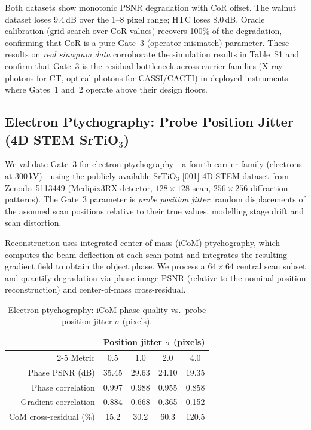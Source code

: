 \documentclass[11pt]{article}
\theoremstyle{definition}
\begin{document}
\noindent Both datasets show monotonic PSNR degradation with CoR offset.
The walnut dataset loses $9.4$\,dB over the 1--8 pixel range; HTC loses $8.0$\,dB.
Oracle calibration (grid search over CoR values) recovers 100\% of the degradation, confirming that CoR is a pure Gate~3 (operator mismatch) parameter.
These results on \emph{real sinogram data} corroborate the simulation results in Table~S1 and confirm that Gate~3 is the residual bottleneck across carrier families (X-ray photons for CT, optical photons for CASSI/CACTI) in deployed instruments where Gates~1 and~2 operate above their design floors.

\subsection{Electron Ptychography: Probe Position Jitter (4D STEM SrTiO\texorpdfstring{$_3$}{3})}
\label{sec:ptycho_real}

We validate Gate~3 for electron ptychography---a fourth carrier family (electrons at 300\,kV)---using the publicly available SrTiO$_3$ [001] 4D-STEM dataset from Zenodo~5113449 (Medipix3RX detector, $128\times128$ scan, $256\times256$ diffraction patterns).
The Gate~3 parameter is \emph{probe position jitter}: random displacements of the assumed scan positions relative to their true values, modelling stage drift and scan distortion.

Reconstruction uses integrated center-of-mass (iCoM) ptychography, which computes the beam deflection at each scan point and integrates the resulting gradient field to obtain the object phase.
We process a $64\times64$ central scan subset and quantify degradation via phase-image PSNR (relative to the nominal-position reconstruction) and center-of-mass cross-residual.

\begin{table}[!ht]
\centering\small
\caption{Electron ptychography: iCoM phase quality vs.\ probe position jitter $\sigma$ (pixels).}
\label{tab:ptycho_jitter}
\begin{tabular}{@{}rcccc@{}}
\toprule
& \multicolumn{4}{c}{Position jitter $\sigma$ (pixels)} \\
\cmidrule(l){2-5}
Metric & 0.5 & 1.0 & 2.0 & 4.0 \\
\midrule
Phase PSNR (dB)          & 35.45 & 29.63 & 24.10 & 19.35 \\
Phase correlation         & 0.997 & 0.988 & 0.955 & 0.858 \\
Gradient correlation      & 0.884 & 0.668 & 0.365 & 0.152 \\
CoM cross-residual (\%)  & 15.2  & 30.2  & 60.3  & 120.5 \\
\bottomrule
\end{tabular}
\end{table}
\end{document}
